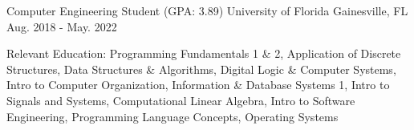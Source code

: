 \begin{cventries}
  \cventry
	{Computer Engineering Student (GPA: 3.89)}
	{University of Florida}
	{Gainesville, FL}
	{Aug. 2018 - May. 2022}
	{
		\begin{cvitems}
			\item {Relevant Education: Programming Fundamentals 1 \& 2, Application of Discrete Structures, Data Structures \& Algorithms, Digital Logic \& Computer Systems, Intro to Computer Organization, Information \& Database Systems 1, Intro to Signals and Systems, Computational Linear Algebra, Intro to Software Engineering, Programming Language Concepts, Operating Systems }
		\end{cvitems}
	}
\end{cventries}
